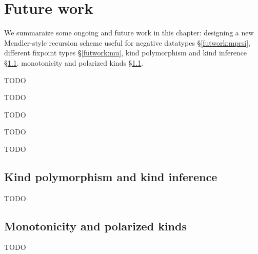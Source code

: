 \chapter{Future work}\label{ch:futwork}
We summaraize some ongoing and future work in this chapter:
designing a new Mendler-style recursion scheme
useful for negative datatypes \S\ref{futwork:mprsi},
different fixpoint types \S\ref{futwork:mu},
kind polymorphism and kind inference \S\ref{sec:futwork:kindpoly}.
monotonicity and polarized kinds \S\ref{sec:futwork:kindpoly}.

TODO

TODO

TODO

TODO

TODO



\section{Kind polymorphism and kind inference}\label{sec:futwork:kindpoly}
TODO

\section{Monotonicity and polarized kinds}\label{sec:futwork:mon}
TODO
